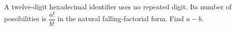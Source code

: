 A twelve-digit hexadecimal identifier uses no repeated digit. Its number of possibilities is $\dfrac{a!}{b!}$ in the natural falling-factorial form. Find $a-b$.
